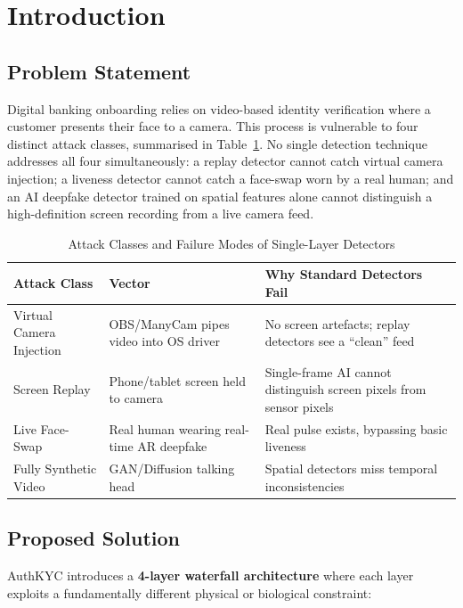 \documentclass[10pt,twocolumn]{IEEEtran}
\begin{document}
\section{Introduction}
\label{sec:intro}

\subsection{Problem Statement}

Digital banking onboarding relies on video-based identity verification where a customer presents their face to a camera. This process is vulnerable to four distinct attack classes, summarised in Table~\ref{tab:attacks}. No single detection technique addresses all four simultaneously: a replay detector cannot catch virtual camera injection; a liveness detector cannot catch a face-swap worn by a real human; and an AI deepfake detector trained on spatial features alone cannot distinguish a high-definition screen recording from a live camera feed.

\begin{table}[ht]
\centering
\caption{Attack Classes and Failure Modes of Single-Layer Detectors}
\label{tab:attacks}
\renewcommand{\arraystretch}{1.15}
\begin{tabular}{@{}p{1.6cm}p{2.0cm}p{3.6cm}@{}}
\toprule
\textbf{Attack Class} & \textbf{Vector} & \textbf{Why Standard Detectors Fail} \\
\midrule
Virtual Camera Injection & OBS/ManyCam pipes video into OS driver & No screen artefacts; replay detectors see a ``clean'' feed \\
Screen Replay & Phone/tablet screen held to camera & Single-frame AI cannot distinguish screen pixels from sensor pixels \\
Live Face-Swap & Real human wearing real-time AR deepfake & Real pulse exists, bypassing basic liveness \\
Fully Synthetic Video & GAN/Diffusion talking head & Spatial detectors miss temporal inconsistencies \\
\bottomrule
\end{tabular}
\end{table}

\subsection{Proposed Solution}

AuthKYC introduces a \textbf{4-layer waterfall architecture} where each layer exploits a fundamentally different physical or biological constraint:
\end{document}
